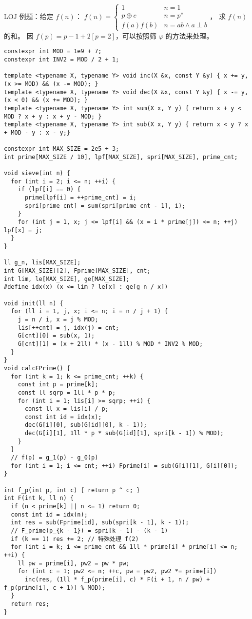 LOJ 例题：给定 $f(n)$：
$f(n) = \begin{cases} 1 & n = 1 \\ p \oplus c & n = p^{c} \\ f(a)f(b) & n = ab \land a \perp b \end{cases}$，
求 $f(n)$ 的和。
因 $f(p) = p - 1 + 2[p = 2]$，可以按照筛 $\varphi$ 的方法来处理。
\begin{lstlisting}
constexpr int MOD = 1e9 + 7;
constexpr int INV2 = MOD / 2 + 1;

template <typename X, typename Y> void inc(X &x, const Y &y) { x += y, (x >= MOD) && (x -= MOD); }
template <typename X, typename Y> void dec(X &x, const Y &y) { x -= y, (x < 0) && (x += MOD); }
template <typename X, typename Y> int sum(X x, Y y) { return x + y < MOD ? x + y : x + y - MOD; }
template <typename X, typename Y> int sub(X x, Y y) { return x < y ? x + MOD - y : x - y;}

constexpr int MAX_SIZE = 2e5 + 3;
int prime[MAX_SIZE / 10], lpf[MAX_SIZE], spri[MAX_SIZE], prime_cnt;

void sieve(int n) {
  for (int i = 2; i <= n; ++i) {
    if (lpf[i] == 0) {
      prime[lpf[i] = ++prime_cnt] = i;
      spri[prime_cnt] = sum(spri[prime_cnt - 1], i);
    }
    for (int j = 1, x; j <= lpf[i] && (x = i * prime[j]) <= n; ++j) lpf[x] = j;
  }
}

ll g_n, lis[MAX_SIZE];
int G[MAX_SIZE][2], Fprime[MAX_SIZE], cnt;
int lim, le[MAX_SIZE], ge[MAX_SIZE];
#define idx(x) (x <= lim ? le[x] : ge[g_n / x])

void init(ll n) {
  for (ll i = 1, j, x; i <= n; i = n / j + 1) {
    j = n / i, x = j % MOD;
    lis[++cnt] = j, idx(j) = cnt;
    G[cnt][0] = sub(x, 1);
    G[cnt][1] = (x + 2ll) * (x - 1ll) % MOD * INV2 % MOD;
  }
}
void calcFPrime() {
  for (int k = 1; k <= prime_cnt; ++k) {
    const int p = prime[k];
    const ll sqrp = 1ll * p * p;
    for (int i = 1; lis[i] >= sqrp; ++i) {
      const ll x = lis[i] / p;
      const int id = idx(x);
      dec(G[i][0], sub(G[id][0], k - 1));
      dec(G[i][1], 1ll * p * sub(G[id][1], spri[k - 1]) % MOD);
    }
  }
  // f(p) = g_1(p) - g_0(p)
  for (int i = 1; i <= cnt; ++i) Fprime[i] = sub(G[i][1], G[i][0]);
}

int f_p(int p, int c) { return p ^ c; }
int F(int k, ll n) {
  if (n < prime[k] || n <= 1) return 0;
  const int id = idx(n);
  int res = sub(Fprime[id], sub(spri[k - 1], k - 1));
  // F_prime(p_{k - 1}) = spri[k - 1] - (k - 1)
  if (k == 1) res += 2; // 特殊处理 f(2)
  for (int i = k; i <= prime_cnt && 1ll * prime[i] * prime[i] <= n; ++i) {
    ll pw = prime[i], pw2 = pw * pw;
    for (int c = 1; pw2 <= n; ++c, pw = pw2, pw2 *= prime[i])
      inc(res, (1ll * f_p(prime[i], c) * F(i + 1, n / pw) + f_p(prime[i], c + 1)) % MOD);
  }
  return res;
}
\end{lstlisting}

